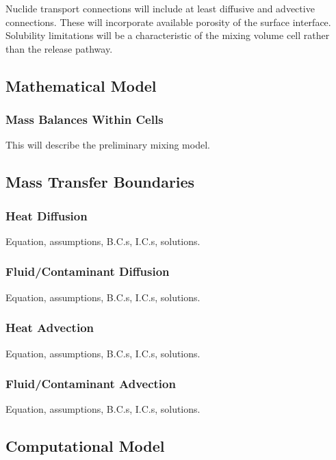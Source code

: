 Nuclide transport connections will include at least diffusive and advective 
connections. These will incorporate available porosity of the surface interface. 
Solubility limitations will be a characteristic of the mixing volume cell rather  
than the release pathway. 

\subsection{Mathematical Model}

\subsubsection{Mass Balances Within Cells}

This will describe the preliminary mixing model.

\subsection{Mass Transfer Boundaries}

\subsubsection{Heat Diffusion}

Equation, assumptions, B.C.s, I.C.s, solutions.

\subsubsection{Fluid/Contaminant Diffusion}

Equation, assumptions, B.C.s, I.C.s, solutions.

\subsubsection{Heat Advection}

Equation, assumptions, B.C.s, I.C.s, solutions.

\subsubsection{Fluid/Contaminant Advection}

Equation, assumptions, B.C.s, I.C.s, solutions.

\subsection{Computational Model}

